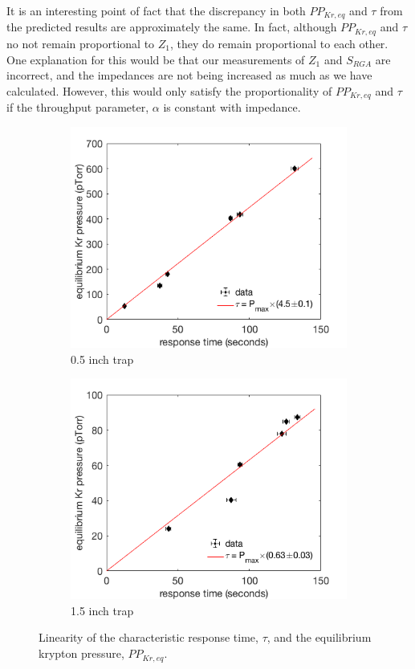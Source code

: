 \documentclass[12pt]{article}
\begin{document}
It is an interesting point of fact that the discrepancy in both $PP_{Kr,eq}$ and $\tau$ from the predicted results are approximately the same. In fact, although $PP_{Kr,eq}$ and $\tau$ no not remain proportional to $Z_1$, they do remain proportional to each other. One explanation for this would be that our measurements of $Z_1$ and $S_{RGA}$ are incorrect, and the impedances are not being increased as much as we have calculated. However, this would only satisfy the proportionality of $PP_{Kr,eq}$ and $\tau$ if the throughput parameter, $\alpha$ is constant with impedance. 
\begin{figure}[h!]
\centering
\begin{subfigure}{0.5\textwidth}
  \centering
  \includegraphics[width=\textwidth]{Figures/SLAC_imp_response_linfit.png}
  \caption{0.5 inch trap}
\end{subfigure}%
\begin{subfigure}{0.5\textwidth}
  \centering
  \includegraphics[width=\textwidth]{Figures/SLAC_imp_response_1p5in_linfit.png}
  \caption{1.5 inch trap}
\end{subfigure}
\caption{Linearity of the characteristic response time, $\tau$, and the equilibrium krypton pressure, $PP_{Kr,eq}$.} 
\label{fig:impresponse_lin}
\end{figure}
\end{document}
